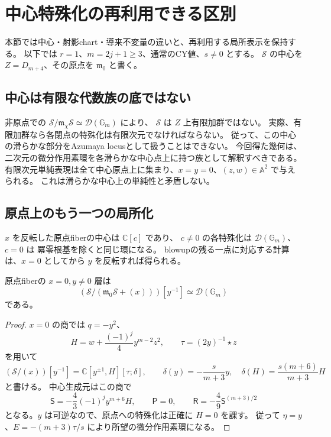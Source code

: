 \section{中心特殊化の再利用できる区別}
\label{sec:central-fiber-notes-v35}

本節では中心・射影chart・導来不変量の違いと、再利用する局所表示を保持する。
以下では $r=1$、$m=2j+1\ge3$、通常のCY値、$s\ne0$ とする。
$\mathcal S$ の中心を $Z=D_{m+4}$、その原点を $\mathfrak m_0$ と書く。

\subsection{中心は有限な代数族の底ではない}

非原点での $\mathcal S/\mathfrak m_\chi\mathcal S\simeq\mathcal D(\mathbb G_m)$ により、
$\mathcal S$ は $Z$ 上有限加群ではない。
実際、有限加群なら各閉点の特殊化は有限次元でなければならない。
従って、この中心の滑らかな部分をAzumaya locusとして扱うことはできない。
今回得た幾何は、二次元の微分作用素環を各滑らかな中心点上に持つ族として解釈すべきである。
有限次元単純表現は全て中心原点上に集まり、$x=y=0$、$(z,w)\in\mathbb A^2$ で与えられる。
これは滑らかな中心上の単純性と矛盾しない。

\subsection{原点上のもう一つの局所化}

$x$ を反転した原点fiberの中心は $\mathbb C[c]$ であり、
$c\ne0$ の各特殊化は $\mathcal D(\mathbb G_m)$、$c=0$ は
冪零根基を除くと同じ環になる。
blowupの残る一点に対応する計算は、$x=0$ としてから $y$ を反転すれば得られる。

\begin{lemma}
原点fiberの $x=0,y\ne0$ 層は
\[
 \left(\mathcal S/(\mathfrak m_0\mathcal S+(x))\right)[y^{-1}]
 \simeq\mathcal D(\mathbb G_m)
\]
である。
\end{lemma}

\begin{proof}
$x=0$ の商では $q=-y^2$、
\[
 H=w+\frac{(-1)^j}{4}y^{m-2}z^2,
 \qquad \tau=(2y)^{-1}\star z
\]
を用いて
\[
 (\mathcal S/(x))[y^{-1}]
 =\mathbb C[y^{\pm1},H][\tau;\delta],\qquad
 \delta(y)=-\frac{s}{m+3}y,\quad
 \delta(H)=\frac{s(m+6)}{m+3}H
\]
と書ける。
中心生成元はこの商で
\[
 \mathsf S=-\frac43(-1)^j y^{m+6}H,\qquad
 \mathsf P=0,\qquad
 \mathsf R=-\frac49\mathsf S^{(m+3)/2}
\]
となる。$y$ は可逆なので、原点への特殊化は正確に $H=0$ を課す。
従って $\eta=y$、$E=-(m+3)\tau/s$ により所望の微分作用素環になる。
\end{proof}

